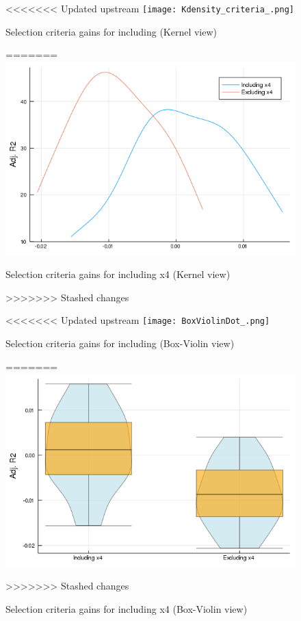 \documentclass{article}
\begin{document}
\begin{figure}[!ht]
  \begin{minipage}[b]{0.48\textwidth}
    \centering
<<<<<<< Updated upstream
    \texttt{[image: Kdensity\_criteria\_.png]}
    \caption{Selection criteria gains for including  (Kernel view)}
=======
    \includegraphics[width=\textwidth]{Kdensity_criteria_x4.png}
    \caption{Selection criteria gains for including x4 (Kernel view)}
>>>>>>> Stashed changes
  \end{minipage}
  \hfill
  \begin{minipage}[b]{0.48\textwidth}
    \centering    
<<<<<<< Updated upstream
    \texttt{[image: BoxViolinDot\_.png]}
    \caption{Selection criteria gains for including  (Box-Violin view)}    
=======
    \includegraphics[width=\textwidth]{BoxViolinDot_x4.png}
    \caption{Selection criteria gains for including x4 (Box-Violin view)}    
>>>>>>> Stashed changes
  \end{minipage}
\end{figure}
\end{document}
